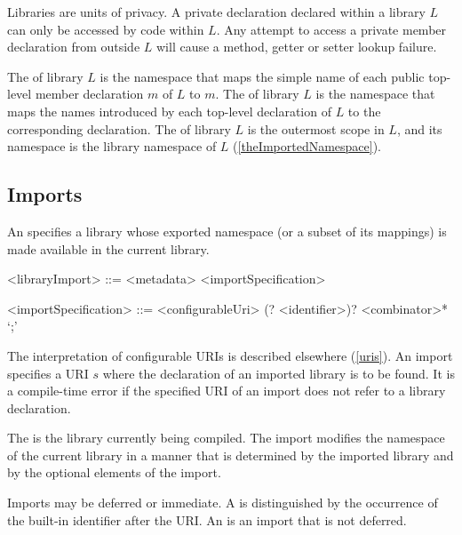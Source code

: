 \documentclass[makeidx]{article}
\begin{document}
{\LMHash{}%
Libraries are units of privacy.
A private declaration declared within a library $L$ can only be accessed by code within $L$.
Any attempt to access a private member declaration from outside $L$ will cause a method, getter or setter lookup failure.


\LMHash{}%
The  of library $L$ is the namespace that maps
the simple name of each public top-level member declaration $m$ of $L$ to $m$.
The  of library $L$ is the namespace that maps
the names introduced by each top-level declaration of $L$
to the corresponding declaration.
The  of library $L$ is the outermost scope in $L$,
and its namespace is the library namespace of $L$
(\ref{theImportedNamespace}).


\subsection{Imports}

\LMHash{}%
An  specifies a library whose exported namespace
(or a subset of its mappings) is made available in the current library.

\begin{grammar}
<libraryImport> ::= <metadata> <importSpecification>

<importSpecification> ::= \gnewline{}
  \IMPORT{} <configurableUri> (\DEFERRED? \AS{} <identifier>)? <combinator>* `;'
\end{grammar}

\LMHash{}%
The interpretation of configurable URIs is described elsewhere
(\ref{uris}).
An import specifies a URI $s$
where the declaration of an imported library is to be found.
It is a compile-time error if the specified URI of an import
does not refer to a library declaration.

\LMHash{}%
The  is the library currently being compiled.
The import modifies the namespace of the current library
in a manner that is determined by the imported library and
by the optional elements of the import.

\LMHash{}%
Imports may be deferred or immediate.
A
is distinguished by the occurrence of
the built-in identifier \DEFERRED{} after the URI.
An
is an import that is not deferred.

}
\end{document}
